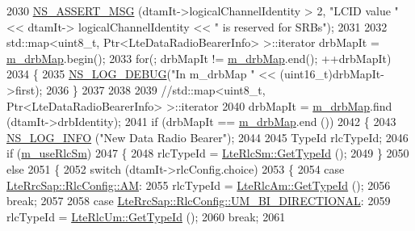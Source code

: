 \begin{DoxyCode}
2030       \hyperlink{assert_8h_aff5ece9066c74e681e74999856f08539}{NS\_ASSERT\_MSG} (dtamIt->logicalChannelIdentity > 2, \textcolor{stringliteral}{"LCID value "} << dtamIt->
      logicalChannelIdentity << \textcolor{stringliteral}{" is reserved for SRBs"});
2031 
2032       std::map<uint8\_t, Ptr<LteDataRadioBearerInfo> >::iterator drbMapIt = 
      \hyperlink{classns3_1_1LteUeRrc_aa85c5bdde73c2072b2b3053e629bdce0}{m\_drbMap}.begin();
2033       \textcolor{keywordflow}{for}(; drbMapIt != \hyperlink{classns3_1_1LteUeRrc_aa85c5bdde73c2072b2b3053e629bdce0}{m\_drbMap}.end(); ++drbMapIt)
2034       \{
2035         \hyperlink{group__logging_ga413f1886406d49f59a6a0a89b77b4d0a}{NS\_LOG\_DEBUG}(\textcolor{stringliteral}{"In m\_drbMap "} << (uint16\_t)drbMapIt->first);
2036       \}
2037 
2038 
2039       \textcolor{comment}{//std::map<uint8\_t, Ptr<LteDataRadioBearerInfo> >::iterator }
2040       drbMapIt = \hyperlink{classns3_1_1LteUeRrc_aa85c5bdde73c2072b2b3053e629bdce0}{m\_drbMap}.find (dtamIt->drbIdentity);
2041       \textcolor{keywordflow}{if} (drbMapIt == \hyperlink{classns3_1_1LteUeRrc_aa85c5bdde73c2072b2b3053e629bdce0}{m\_drbMap}.end ())
2042         \{
2043           \hyperlink{group__logging_gafbd73ee2cf9f26b319f49086d8e860fb}{NS\_LOG\_INFO} (\textcolor{stringliteral}{"New Data Radio Bearer"});
2044 
2045           TypeId rlcTypeId;
2046           \textcolor{keywordflow}{if} (\hyperlink{classns3_1_1LteUeRrc_a724b0f4009ef95b569c52afb344fd5ae}{m\_useRlcSm})
2047             \{
2048               rlcTypeId = \hyperlink{classns3_1_1LteRlcSm_a160bd39ce4e0d113dd5d93cc3a258045}{LteRlcSm::GetTypeId} ();
2049             \}
2050           \textcolor{keywordflow}{else}
2051             \{
2052               \textcolor{keywordflow}{switch} (dtamIt->rlcConfig.choice)
2053                 \{
2054                 \textcolor{keywordflow}{case} \hyperlink{structns3_1_1LteRrcSap_1_1RlcConfig_ab6ab94ca4abaf717926f31db4dddc61baac722b7609a143367fc24a94f8e4f6c7}{LteRrcSap::RlcConfig::AM}: 
2055                   rlcTypeId = \hyperlink{classns3_1_1LteRlcAm_a28143176a465769583d9db0b4b36b91b}{LteRlcAm::GetTypeId} ();
2056                   \textcolor{keywordflow}{break};
2057           
2058                 \textcolor{keywordflow}{case} \hyperlink{structns3_1_1LteRrcSap_1_1RlcConfig_ab6ab94ca4abaf717926f31db4dddc61ba55368feac1627138969235809e6eedc5}{LteRrcSap::RlcConfig::UM\_BI\_DIRECTIONAL}: 
2059                   rlcTypeId = \hyperlink{classns3_1_1LteRlcUm_a119b2b1273c42483a050896d5232829d}{LteRlcUm::GetTypeId} ();
2060                   \textcolor{keywordflow}{break};
2061           

\end{DoxyCode}
